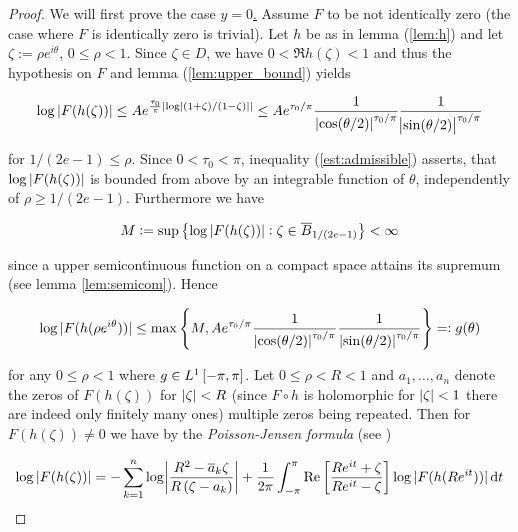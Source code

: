 \begin{proof}
	We will first prove the case \underline{$y = 0$.} Assume $F$ to be not identically zero (the case where $F$ is identically zero is trivial). Let $h$ be as in lemma (\ref{lem:h}) and let $\zeta := \rho e^{i\theta}$, $0 \leq \rho < 1$. Since $\zeta \in D$, we have $0 < \Re h(\zeta) < 1$ and thus the hypothesis on $F$ and lemma (\ref{lem:upper_bound}) yields

\begin{gather}
	\log \abs[0]{ F(h(\zeta))} \leq Ae^{\frac{\tau_0}{\pi}\abs[0]{ \log \abs[0]{\del[0]{1 + \zeta}/\del[0]{1 - \zeta}}}} \leq Ae^{\tau_0/\pi}\frac{1}{\abs[0]{ \cos(\theta/2) }^{\tau_0/\pi}}\frac{1}{\abs{ \sin(\theta/2) }^{\tau_0/\pi}}
	\label{est:admissible}
\end{gather}

\noindent for $1/(2e - 1) \leq \rho$. Since $0 < \tau_0 < \pi$, inequality (\ref{est:admissible}) asserts, that $\log \abs[0]{ F(h(\zeta))}$ is bounded from above by an integrable function of $\theta$, independently of $\rho \geq 1/(2e - 1)$. Furthermore we have 

	\begin{equation}
		M := \sup\cbr[1]{\log \abs[0]{ F(h(\zeta))} : \zeta \in \overline{B}_{1/\del[0]{2e - 1 }}} < \infty
	\end{equation}

	\noindent since a upper semicontinuous function on a compact space attains its supremum (see lemma \ref{lem:semicom}). Hence

	\begin{equation}
		\log\abs[0]{ F( h( \rho e^{i\theta} ))} \leq \max\cbr[4]{ M,   Ae^{\tau_0/\pi}\frac{1}{\abs[0]{ \cos(\theta/2) }^{\tau_0/\pi}}\frac{1}{\abs[0]{ \sin(\theta/2) }^{\tau_0/\pi}}} =: g( \theta )
		\label{est:log}
	\end{equation}

	\noindent for any $0 \leq \rho < 1$ where $g \in L^1\intcc{-\pi,\pi}$. Let $0 \leq \rho < R < 1$ and $a_1,\dots,a_n$ denote the zeros of $F(h(\zeta))$ for $\abs[0]{ \zeta} < R$ (since $F \circ h$ is holomorphic for $\abs[0]{ \zeta} < 1$ there are indeed only finitely many ones) multiple zeros being repeated. Then for $F(h(\zeta)) \neq 0$ we have by the \emph{Poisson-Jensen formula} (see \cite[208]{ahlfors:complex_analysis:1979})

	\begin{equation}
		\log\abs[0]{ F(h(\zeta))} = - \sum_{k = 1}^n \log\abs[3]{ \frac{R^2 - \overline{a}_k\zeta}{R\del[0]{ \zeta - a_k }}}	+ \frac{1}{2\pi}\int_{-\pi}^\pi \Re \sbr[3]{\frac{R e^{it} + \zeta}{R e^{it} - \zeta}}\log\abs[0]{ F(h(R e^{it}))}\d t
	\end{equation}


\end{proof}
